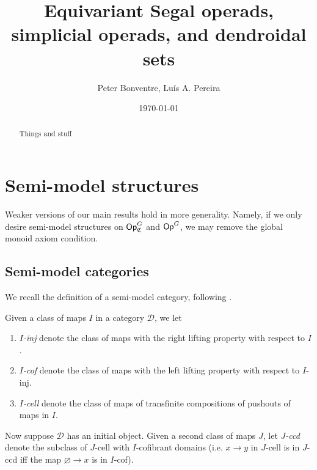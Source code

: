 \documentclass[a4paper,10pt
]{article}%
\title{Equivariant Segal operads, simplicial operads, and dendroidal sets}
\author{Peter Bonventre, Lu\'is A. Pereira}%
\date{\today}
\renewcommand{\1}{\eta}%
\begin{document}
\maketitle

\begin{abstract}
      Things and stuff
\end{abstract}

\tableofcontents






\section{Semi-model structures}

Weaker versions of our main results hold in more generality.
Namely, if we only desire semi-model structures on $\mathsf{Op}^G_{\mathfrak C}$ and $\mathsf{Op}^G$, we may
remove the global monoid axiom condition.


\subsection{Semi-model categories}

We recall the definition of a semi-model category, following \cite{Spi01,Wh16}.

\begin{definition}
	Given a class of maps $ I$ in a category $\mathcal D$, we let
	\begin{enumerate}[label = (\roman*)]
		\item \textit{$ I$-inj} denote the class of maps with the right lifting property with respect to $ I$.
		\item \textit{$ I$-cof} denote the class of maps with the left lifting property with respect to $ I$-inj.
		\item \textit{$ I$-cell} denote the class of maps of transfinite compositions of pushouts of maps in $ I$.
	\end{enumerate}
	
	Now suppose $\mathcal D$ has an initial object.
	Given a second class of maps $ J$, let \textit{$ J$-ccd} denote
	the subclass of $ J$-cell with $ I$-cofibrant domains
	(i.e. $x \to y$ in $ J$-cell is in $ J$-ccd iff the map $\varnothing \to x$ is in $ I$-cof).
\end{definition}
\end{document}
